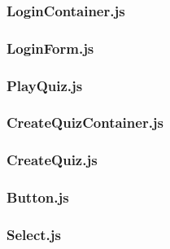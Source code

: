 \subsubsection{LoginContainer.js} %
\label{ssub:login_js}


\subsubsection{LoginForm.js} %
\label{ssub:loginform_js}


\subsubsection{PlayQuiz.js} %
\label{ssub:playquiz_js}


\subsubsection{CreateQuizContainer.js} %
\label{ssub:createquiz_js}


\subsubsection{CreateQuiz.js} %
\label{ssub:createquiz_js}


\subsubsection{Button.js} %
\label{ssub:yearselector_js}


\subsubsection{Select.js} %
\label{ssub:yearselector_js}

